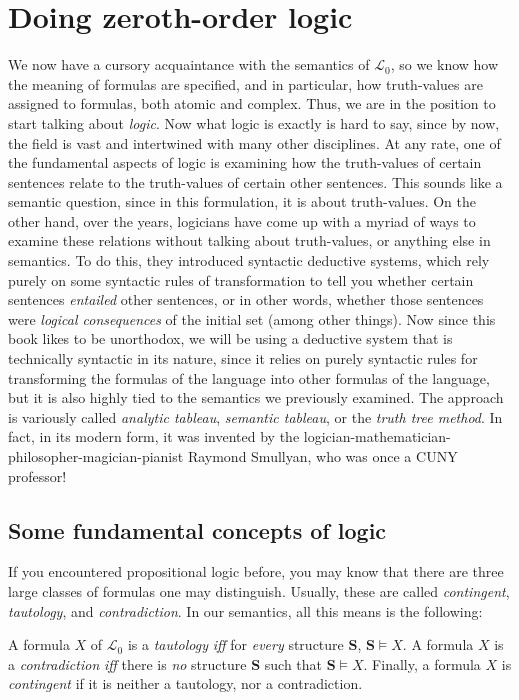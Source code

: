 \chapter{Doing zeroth-order logic}

We now have a cursory acquaintance with the semantics of $\mathcal{L}_0$, so we know how the meaning of formulas are specified, and in particular, how truth-values are assigned to formulas, both atomic and complex. Thus, we are in the position to start talking about \textit{logic}. Now what logic is exactly is hard to say, since by now, the field is vast and intertwined with many other disciplines. At any rate, one of the fundamental aspects of logic is examining how the truth-values of certain sentences relate to the truth-values of certain other sentences. This sounds like a semantic question, since in this formulation, it is about truth-values. On the other hand, over the years, logicians have come up with a myriad of ways to examine these relations without talking about truth-values, or anything else in semantics. To do this, they introduced syntactic deductive systems, which rely purely on some syntactic rules of transformation to tell you whether certain sentences \textit{entailed} other sentences, or in other words, whether those sentences were \textit{logical consequences} of the initial set (among other things). Now since this book likes to be unorthodox, we will be using a deductive system that is technically syntactic in its nature, since it relies on purely syntactic rules for transforming the formulas of the language into other formulas of the language, but it is also highly tied to the semantics we previously examined. The approach is variously called \textit{analytic tableau}, \textit{semantic tableau}, or the \textit{truth tree method}. In fact, in its modern form, it was invented by the logician-mathematician-philosopher-magician-pianist Raymond Smullyan, who was once a CUNY professor! 

\section{Some fundamental concepts of logic}

If you encountered propositional logic before, you may know that there are three large classes of formulas one may distinguish. Usually, these are called \textit{contingent}, \textit{tautology}, and \textit{contradiction}. In our semantics, all this means is the following:

\begin{defn}
A formula $X$ of $\mathcal{L}_0$ is a \textit{tautology} \textit{iff} for \textit{every} structure $\mathbf{S}$, $\mathbf{S} \models X$. A formula $X$ is a \textit{contradiction} \textit{iff} there is \textit{no} structure $\mathbf{S}$ such that $\mathbf{S} \models X$. Finally, a formula $X$ is \textit{contingent} if it is neither a tautology, nor a contradiction. 
\end{defn}

